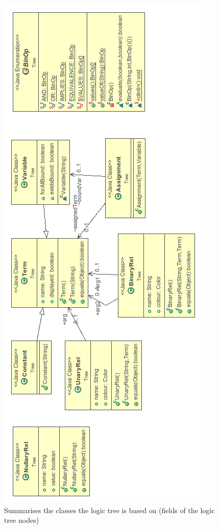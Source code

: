 \documentclass{report}
\begin{document}
\begin{figure}[h!]
\centering \includegraphics[height=\textheight]{treeBase.png}
\caption{Summarises the classes the logic tree is based on (fields of the logic 
tree nodes)}
\end{figure}
\newpage
\end{document}
